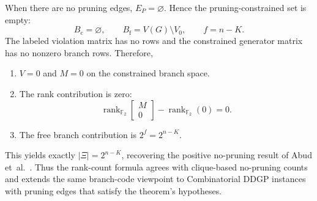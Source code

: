 When there are no pruning edges, $E_P=\varnothing$. Hence the pruning-constrained set is empty:
\[
B_{\mathrm{c}}=\varnothing,
\qquad
B_{\mathrm{f}}=V(G)\setminus V_0,
\qquad
f=n-K.
\]
The labeled violation matrix has no rows and the constrained generator matrix has no nonzero branch rows. Therefore,
\begin{enumerate}
    \item $V=0$ and $M=0$ on the constrained branch space.
    \item The rank contribution is zero:
    \[
    \operatorname{rank}_{\mathbb{F}_2}\begin{bmatrix} M \\ 0 \end{bmatrix} - \operatorname{rank}_{\mathbb{F}_2}(0)
    =0.
    \]
    \item The free branch contribution is $2^f=2^{n-K}$.
\end{enumerate}
This yields exactly $\lvert \Xi \rvert = 2^{n-K}$, recovering the positive no-pruning result of Abud et~al.~\cite{abud2024impossible}. Thus the rank-count formula agrees with clique-based no-pruning counts and extends the same branch-code viewpoint to Combinatorial DDGP instances with pruning edges that satisfy the theorem's hypotheses.
